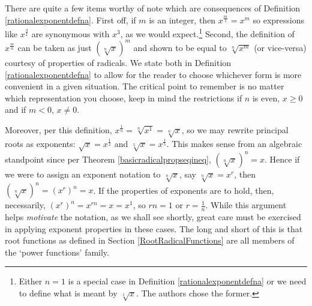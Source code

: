 \documentclass{ximera}
\begin{document}

 

There are quite a few items worthy of note which are consequences of Definition \ref{rationalexponentdefna}.  First off, if $m$ is an integer, then $x^{\frac{m}{1}}  = x^{m}$ so expressions like $x^{\frac{3}{1}}$  are synonymous with  $x^3$, as we would expect.\footnote{Either $n=1$ is a special case in Definition \ref{rationalexponentdefna} or we need to define what is meant by $\sqrt[1]{x}$.  The authors chose the former.}   Second, the definition of $x^{\frac{m}{n}}$ can be taken as just $\left(\sqrt[n]{x}\right)^m$ and shown to be equal to $\sqrt[n]{x^m}$ (or vice-versa) courtesy of properties of radicals.  We state both in  Definition \ref{rationalexponentdefna} to allow for the reader to choose whichever form is more convenient in a given situation.  The  critical point to remember is no matter which representation you choose, keep in mind the restrictions if $n$ is even, $x \geq 0$ and if $m < 0$, $x \neq 0$.  

Moreover,  per this definition,  $x^{\frac{1}{n}} = \sqrt[n]{x^{1}} = \sqrt[n]{x}$, so we may rewrite principal roots as exponents: $\sqrt{x} = x^{\frac{1}{2}}$ and $\sqrt[5]{x} = x^{\frac{1}{5}}$. This makes sense from an algebraic standpoint since per Theorem \ref{basicradicalpropseqineq}, $\left(\sqrt[n]{x} \right)^n = x$.  Hence if we were to assign an exponent notation to  $\sqrt[n]{x}$, say $\sqrt[n]{x} = x^r$, then  $\left(\sqrt[n]{x}\right)^n = (x^r)^n = x$.  If the properties of exponents are to hold, then, necessarily, $ (x^r)^n = x^{rn} = x = x^{1}$, so $rn = 1$ or $r = \frac{1}{n}$. While this argument helps \textit{motivate} the notation, as we shall see shortly, great care must be exercised in applying exponent properties in these cases.  The long and short of this is that root functions as defined in Section \ref{RootRadicalFunctions} are all members of the `power functions' family.
  
\end{document}

